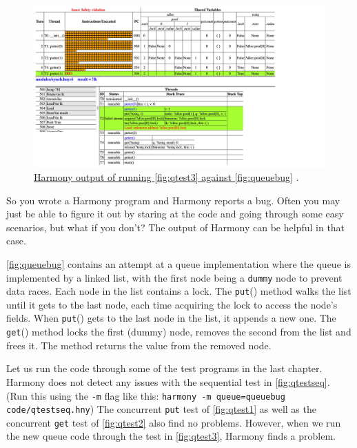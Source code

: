 \documentclass{report}
\newcommand{\harmonyref}[2]{%
\href{https://harmony.cs.cornell.edu/output/#1}{\underline{#2}}%
}
\begin{document}
\begin{figure}
\begin{center}
\includegraphics[width=\textwidth]{figures/queuebug1.pdf}
\end{center}
\caption{\harmonyref{queuebug.html}{Harmony output of running \autoref{fig:qtest3} against
\autoref{fig:queuebug}}.}
\label{fig:queuebug1}
\end{figure}

So you wrote a Harmony program and Harmony reports a bug.
Often you may just be able to figure it out by staring at the code and
going through some easy scenarios, but what if you don't?
The output of Harmony can be helpful in that case.

\autoref{fig:queuebug} contains an attempt at a queue implementation
where the queue is implemented by a linked list, with the first node
being a \texttt{dummy} node to prevent data races.  Each node in the
list contains a lock.  The \texttt{put}() method walks the list until
it gets to the last node, each time acquiring the lock to access the
node's fields.  When \texttt{put}() gets to the last node in the list,
it appends a new one.  The \texttt{get}() method locks the first (dummy)
node, removes the second from the list and frees it.  The method returns
the value from the removed node.

Let us run the code through some of the test programs in the last
chapter.  Harmony does not detect any issues with the sequential test
in \autoref{fig:qtestseq}.
(Run this using the \texttt{-m} flag like this:
\texttt{harmony -m queue=queuebug code/qtestseq.hny})
The concurrent \texttt{put} test of
\autoref{fig:qtest1} as well as the concurrent \texttt{get} test of
\autoref{fig:qtest2} also find no problems.  However, when we run
the new queue code through the test in \autoref{fig:qtest3}, Harmony
finds a problem.
\end{document}
